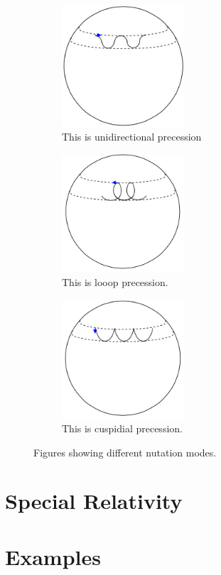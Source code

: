 \documentclass{book}
\begin{document}
\begin{figure}
	\centering
	\begin{subfigure}[b]{0.3\textwidth}
		\centering
		\includegraphics[width=130pt]{nutation1.png}
		\caption{This is unidirectional precession}
		\label{unidirectional}
	\end{subfigure}
	\begin{subfigure}[b]{0.3\textwidth}
		\centering
		\includegraphics[width=130pt]{nutation3.png}
		\caption{This is looop precession.}
		\label{looping}
	\end{subfigure}
	\begin{subfigure}[b]{0.3\textwidth}
		\centering
		\includegraphics[width=130pt]{nutation4.png}
		\caption{This is cuspidial precession.}
		\label{cuspidal}
	\end{subfigure}
	\caption{Figures showing different nutation modes.}
\end{figure}
\chapter{Special Relativity}

\appendix
\chapter{Examples}
\end{document}

